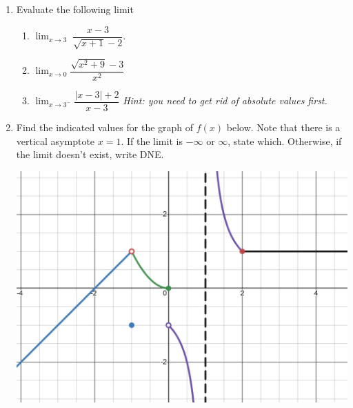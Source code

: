 \documentclass[12pt]{article}
\begin{document}
\begin{enumerate}
\item Evaluate the following limit 
\begin{enumerate}
    \item $\displaystyle\lim_{x\to 3} \; \dfrac{x-3}{\sqrt{x+1}-2}.$
    \vfill
    \item $\displaystyle\lim_{x\to 0} \dfrac{\sqrt{x^2+9}-3}{x^2}$
    \vfill
    \item $\displaystyle\lim_{x\to 3^{-}} \dfrac{|x-3|+2}{x-3}$ \quad \emph{Hint: you need to get rid of absolute values first.}
    \vfill
\end{enumerate}

\pagebreak

\item Find the indicated values for the graph of $f(x)$ below. Note that there is a vertical asymptote $x=1$. If the limit is $-\infty$ or $\infty$, state which. Otherwise, if the limit doesn't exist, write DNE.
\vspace{0.25in}
\begin{center}
\includegraphics[scale=0.3]{Images/Sum23pmt1pic2.jpeg}
\end{center}
\vspace{0.25in}
\begin{enumerate}
\end{enumerate}
\end{enumerate}
\end{document}
